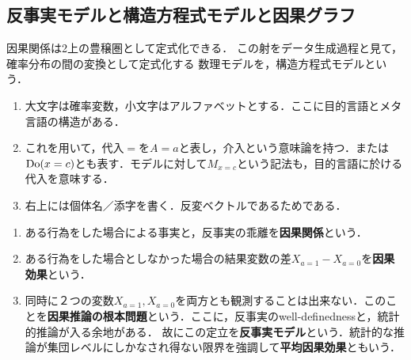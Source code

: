 \documentclass[uplatex,dvipdfmx]{jsreport}
\begin{document}
\subsection{反事実モデルと構造方程式モデルと因果グラフ}

\begin{tcolorbox}[colframe=ForestGreen, colback=ForestGreen!10!white,breakable,colbacktitle=ForestGreen!40!white,coltitle=black,fonttitle=\bfseries\sffamily,
title=]
    因果関係は2上の豊穣圏として定式化できる．
    この射をデータ生成過程と見て，確率分布の間の変換として定式化する
    数理モデルを，構造方程式モデルという．
\end{tcolorbox}

\begin{notation}[数学基礎論的記号設定]\mbox{}
    \begin{enumerate}
        \item 大文字は確率変数，小文字はアルファベットとする．ここに目的言語とメタ言語の構造がある．
        \item これを用いて，代入$=$を$A=a$と表し，介入という意味論を持つ．または$\mathrm{Do}(x=c)$とも表す．モデルに対して$M_{x=c}$という記法も，目的言語に於ける代入を意味する．
        \item 右上には個体名／添字を書く．反変ベクトルであるためである．
    \end{enumerate}
\end{notation}

\begin{axiom}\mbox{}
    \begin{enumerate}
        \item ある行為をした場合による事実と，反事実の乖離を\textbf{因果関係}という．
        \item ある行為をした場合としなかった場合の結果変数の差$X_{a=1}-X_{a=0}$を\textbf{因果効果}という．
        \item 同時に２つの変数$X_{a=1},X_{a=0}$を両方とも観測することは出来ない．このことを\textbf{因果推論の根本問題}という．ここに，反事実のwell-definednessと，統計的推論が入る余地がある．
        故にこの定立を\textbf{反事実モデル}という．統計的な推論が集団レベルにしかなされ得ない限界を強調して\textbf{平均因果効果}ともいう．
    \end{enumerate}
\end{axiom}
\end{document}
